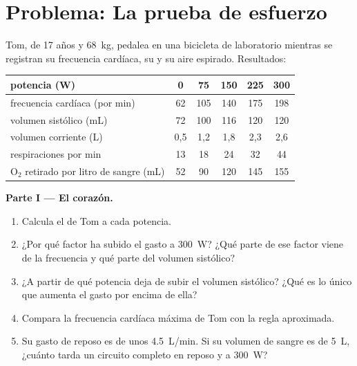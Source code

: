 \section{Problema: La prueba de esfuerzo}

\begin{problem}
\label{pb:g10:heart-lungs-effort:1}
Tom, de 17 años y \qty{68}{kg}, pedalea en una bicicleta de laboratorio
mientras se registran su frecuencia cardíaca, su  y su aire
espirado. Resultados:

\begin{center}
\begin{tabular}{lccccc}
potencia (W) & 0 & 75 & 150 & 225 & 300 \\ \hline
frecuencia cardíaca (por min) & 62 & 105 & 140 & 175 & 198 \\
volumen sistólico (mL) & 72 & 100 & 116 & 120 & 120 \\
volumen corriente (L) & 0,5 & 1,2 & 1,8 & 2,3 & 2,6 \\
respiraciones por min & 13 & 18 & 24 & 32 & 44 \\
$\mathrm{O_2}$ retirado por litro de sangre (mL) & 52 & 90 & 120 & 145 & 155 \\
\end{tabular}
\end{center}

\medskip
\noindent\textbf{Parte I --- El corazón.}
\begin{enumerate}
  \item Calcula el  de Tom a cada potencia.
  \item ¿Por qué factor ha subido el gasto a \qty{300}{W}? ¿Qué parte
        de ese factor viene de la frecuencia y qué parte del volumen
        sistólico?
  \item ¿A partir de qué potencia deja de subir el volumen sistólico?
        ¿Qué es lo único que aumenta el gasto por encima de ella?
  \item Compara la frecuencia cardíaca máxima de Tom con la regla
        aproximada.
  \item Su gasto de reposo es de unos \qty{4.5}{L/min}. Si su volumen
        de sangre es de \qty{5}{L}, ¿cuánto tarda un circuito completo
        en reposo y a \qty{300}{W}?
\end{enumerate}


\end{problem}
